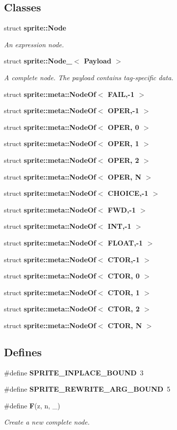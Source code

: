 \subsection*{Classes}
\begin{CompactItemize}
\item 
struct {\bf sprite::Node}
\begin{CompactList}\small\item\em An expression node. \item\end{CompactList}\item 
struct {\bf sprite::Node\_\-$<$ Payload $>$}
\begin{CompactList}\small\item\em A complete node. The payload contains tag-specific data. \item\end{CompactList}\item 
struct {\bf sprite::meta::Node\-Of$<$ FAIL,-1 $>$}
\item 
struct {\bf sprite::meta::Node\-Of$<$ OPER,-1 $>$}
\item 
struct {\bf sprite::meta::Node\-Of$<$ OPER, 0 $>$}
\item 
struct {\bf sprite::meta::Node\-Of$<$ OPER, 1 $>$}
\item 
struct {\bf sprite::meta::Node\-Of$<$ OPER, 2 $>$}
\item 
struct {\bf sprite::meta::Node\-Of$<$ OPER, N $>$}
\item 
struct {\bf sprite::meta::Node\-Of$<$ CHOICE,-1 $>$}
\item 
struct {\bf sprite::meta::Node\-Of$<$ FWD,-1 $>$}
\item 
struct {\bf sprite::meta::Node\-Of$<$ INT,-1 $>$}
\item 
struct {\bf sprite::meta::Node\-Of$<$ FLOAT,-1 $>$}
\item 
struct {\bf sprite::meta::Node\-Of$<$ CTOR,-1 $>$}
\item 
struct {\bf sprite::meta::Node\-Of$<$ CTOR, 0 $>$}
\item 
struct {\bf sprite::meta::Node\-Of$<$ CTOR, 1 $>$}
\item 
struct {\bf sprite::meta::Node\-Of$<$ CTOR, 2 $>$}
\item 
struct {\bf sprite::meta::Node\-Of$<$ CTOR, N $>$}
\end{CompactItemize}
\subsection*{Defines}
\begin{CompactItemize}
\item 
\#define {\bf SPRITE\_\-INPLACE\_\-BOUND}\ 3
\item 
\#define {\bf SPRITE\_\-REWRITE\_\-ARG\_\-BOUND}\ 5
\item 
\#define {\bf F}(z, n, \_\-)
\begin{CompactList}\small\item\em Create a new complete node. \item\end{CompactList}\end{CompactItemize}
